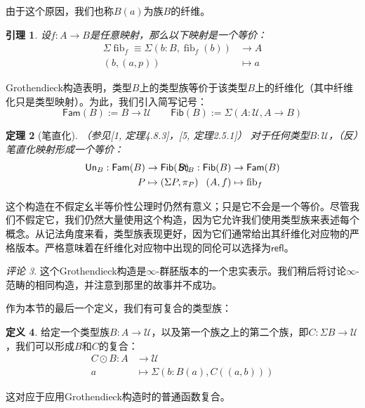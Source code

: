\documentclass{ctexrep}
\theoremstyle{plain}
\newtheorem{theorem}{定理}[section]
\newtheorem{lemma}[theorem]{引理}
\theoremstyle{definition}
\newtheorem{definition}[theorem]{定义}
\theoremstyle{remark}
\newtheorem{remark}[theorem]{评论}
\theoremstyle{definition}
\theoremstyle{definition}
\theoremstyle{definition}
\newcommand{\coloneqq}{\mathrel{:=}}
\newcommand{\fib}{\operatorname{fib}}
\newcommand{\refl}{\mathsf{refl}}
\newcommand{\UU}{\mathcal{U}}
\begin{document}
由于这个原因，我们也称$B(a)$为族$B$的纤维。

\begin{lemma}
设$f:A\to B$是任意映射，那么以下映射是一个等价：
\begin{align*}
\Sigma\fib_f \equiv \Sigma(b:B,\fib_f(b)) &\to A\\
 (b,(a,p))&\mapsto a
\end{align*}
\end{lemma}

Grothendieck构造表明，类型$B$上的类型族等价于该类型$B$上的纤维化（其中纤维化只是类型映射）。为此，我们引入简写记号：
\[
\mathsf{Fam}(B)\coloneqq B\to\UU \qquad \mathsf{Fib}(B)\coloneqq \Sigma(A:\UU,A\to B)
\]

\begin{theorem}[笔直化]（参见[1, 定理4.8.3]，[5, 定理2.5.1]）
对于任何类型$B:\UU$，（反）笔直化映射形成一个等价：
\begin{align*}
\mathsf{Un}_B : \mathsf{Fam}(B) &\to \mathsf{Fib}(B) & \hspace{-3em}\mathsf{St}_B : \mathsf{Fib}(B) &\to \mathsf{Fam}(B) \\
P &\mapsto (\Sigma P, \pi_P) &\hspace{-3em} (A, f) &\mapsto \fib_f
\end{align*}
\end{theorem}

这个构造在不假定幺半等价性公理时仍然有意义；只是它不会是一个等价。尽管我们不假定它，我们仍然大量使用这个构造，因为它允许我们使用类型族来表述每个概念。从记法角度来看，类型族表现更好，因为它们通常给出其纤维化对应物的严格版本。严格意味着在纤维化对应物中出现的同伦可以选择为$\refl$。

\begin{remark}
这个Grothendieck构造是$\infty$-群胚版本的一个忠实表示。我们稍后将讨论$\infty$-范畴的相同构造，并注意到那里的故事并不成功。
\end{remark}

作为本节的最后一个定义，我们有可复合的类型族：

\begin{definition}
给定一个类型族$B:A\to\UU$，以及第一个族之上的第二个族，即$C:\Sigma B\to\UU$，我们可以形成$B$和$C$的复合：
\begin{align*}
C\odot B:A &\to\UU \\
a &\mapsto \Sigma(b:B(a),C((a,b)))
\end{align*}
\end{definition}
这对应于应用Grothendieck构造时的普通函数复合。
\end{document}
